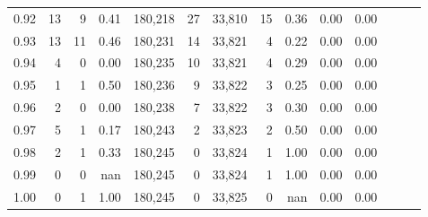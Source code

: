 \begin{tabular}{rrrrrrrrrrrrrr}
0.92 &     13 &    9 &  0.41 &  180,218 &       27 &  33,810 &      15 &  0.36 &  0.00 &      0.00 \\
0.93 &     13 &   11 &  0.46 &  180,231 &       14 &  33,821 &       4 &  0.22 &  0.00 &      0.00 \\
0.94 &      4 &    0 &  0.00 &  180,235 &       10 &  33,821 &       4 &  0.29 &  0.00 &      0.00 \\
0.95 &      1 &    1 &  0.50 &  180,236 &        9 &  33,822 &       3 &  0.25 &  0.00 &      0.00 \\
0.96 &      2 &    0 &  0.00 &  180,238 &        7 &  33,822 &       3 &  0.30 &  0.00 &      0.00 \\
0.97 &      5 &    1 &  0.17 &  180,243 &        2 &  33,823 &       2 &  0.50 &  0.00 &      0.00 \\
0.98 &      2 &    1 &  0.33 &  180,245 &        0 &  33,824 &       1 &  1.00 &  0.00 &      0.00 \\
0.99 &      0 &    0 &   nan &  180,245 &        0 &  33,824 &       1 &  1.00 &  0.00 &      0.00 \\
1.00 &      0 &    1 &  1.00 &  180,245 &        0 &  33,825 &       0 &   nan &  0.00 &      0.00 \\
\bottomrule
\end{tabular}
